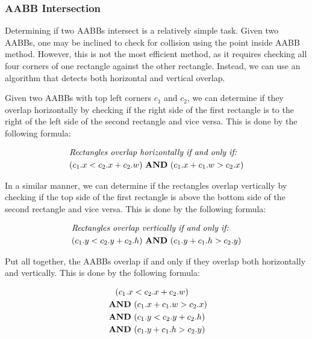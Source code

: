 \documentclass{article}
\renewcommand{\land}{\,\,\textrm{\textbf{AND}}\,\,}
\begin{document}
\newpage
\subsubsection{AABB Intersection}

Determining if two AABBs intersect is a relatively simple task. Given two
AABBs, one may be inclined to check for collision using the point inside AABB
method. However, this is not the most efficient method, as it requires checking
all four corners of one rectangle against the other rectangle. Instead, we can
use an algorithm that detects both horizontal and vertical overlap.

Given two AABBs with top left corners $c_1$ and $c_2$, we can determine if they
overlap horizontally by checking if the right side of the first rectangle is to
the right of the left side of the second rectangle and vice versa. This is done
by the following formula:

\begin{equation}
    \begin{aligned}
         & \textit{Rectangles overlap horizontally if and only if:} \\
         & (c_1.x < c_2.x + c_2.w) \land (c_1.x + c_1.w > c_2.x)
    \end{aligned}
\end{equation}

In a similar manner, we can determine if the rectangles overlap vertically by
checking if the top side of the first rectangle is above the bottom side of the
second rectangle and vice versa. This is done by the following formula:

\begin{equation}
    \begin{aligned}
         & \textit{Rectangles overlap vertically if and only if:} \\
         & (c_1.y < c_2.y + c_2.h) \land (c_1.y + c_1.h > c_2.y)
    \end{aligned}
\end{equation}

Put all together, the AABBs overlap if and only if they overlap both
horizontally and vertically. This is done by the following formula:

\begin{equation}
    \begin{aligned}
         & \hspace{1.1em} (c_1.x < c_2.x + c_2.w) \\
         & \land (c_1.x + c_1.w > c_2.x)          \\
         & \land (c_1.y < c_2.y + c_2.h)          \\
         & \land (c_1.y + c_1.h > c_2.y)
    \end{aligned}
\end{equation}
\end{document}
